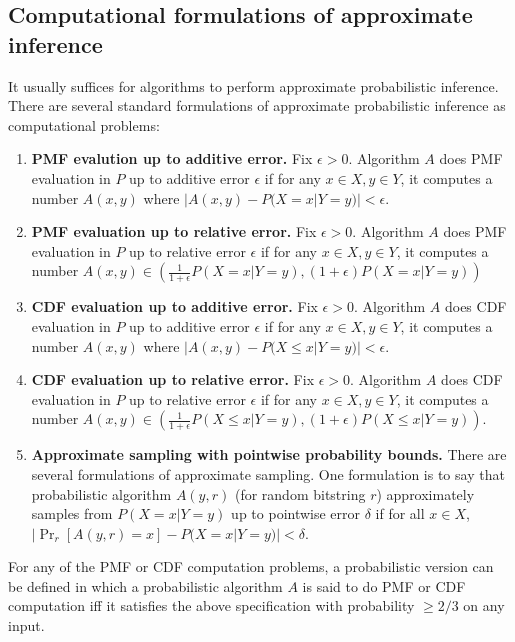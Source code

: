 \documentclass{article}
\theoremstyle{definition}
\theoremstyle{remark}
\begin{document}

\subsection{Computational formulations of approximate inference}
It usually suffices for algorithms to perform approximate probabilistic inference.
There are several standard formulations of approximate probabilistic inference as computational problems:
\begin{enumerate}
    \item \textbf{PMF evalution up to additive error.} Fix $\epsilon > 0$.  Algorithm $A$ does PMF evaluation in $P$ up to additive error $\epsilon$ if for any $x \in X, y \in Y$, it computes a number $A(x, y)$ where $|A(x, y) - P(X = x | Y = y)| < \epsilon$.
    \item \textbf{PMF evaluation up to relative error.} Fix $\epsilon > 0$.  Algorithm $A$ does PMF evaluation in $P$ up to relative error $\epsilon$ if for any $x \in X, y \in Y$, it computes a number $A(x, y) \in (\frac{1}{1 + \epsilon}P(X = x | Y = y), (1 + \epsilon)P(X = x | Y = y))$
    \item \textbf{CDF evaluation up to additive error.} Fix $\epsilon > 0$.  Algorithm $A$ does CDF evaluation in $P$ up to additive error $\epsilon$ if for any $x \in X, y \in Y$, it computes a number $A(x, y)$ where $|A(x, y) - P(X \leq x | Y = y)| < \epsilon$.
    \item \textbf{CDF evaluation up to relative error.} Fix $\epsilon > 0$.  Algorithm $A$ does CDF evaluation in $P$ up to relative error $\epsilon$ if for any $x \in X, y \in Y$, it computes a number $A(x, y) \in (\frac{1}{1 + \epsilon}P(X \leq x | Y = y), (1 + \epsilon)P(X \leq x | Y = y))$.
    \item \textbf{Approximate sampling with pointwise probability bounds.} There are several formulations of approximate sampling. One formulation is to say that probabilistic algorithm $A(y, r)$ (for random bitstring $r$) approximately samples from $P(X = x | Y = y)$ up to pointwise error $\delta$ if for all $x \in X$, $|\Pr_r[A(y, r) = x] - P(X = x | Y = y)| < \delta$.
\end{enumerate}
For any of the PMF or CDF computation problems, a probabilistic version can be defined in which a probabilistic algorithm $A$ is said to do PMF or CDF computation iff it satisfies the above specification with probability $\geq 2/3$ on any input.
\end{document}

